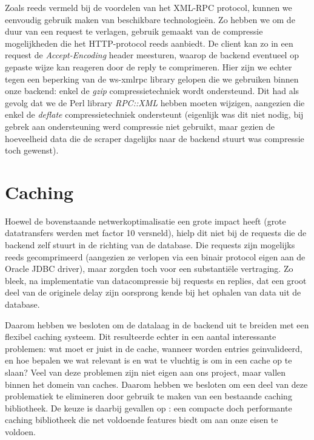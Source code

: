 Zoals reeds vermeld bij de voordelen van het XML-RPC protocol, kunnen we eenvoudig gebruik maken van beschikbare technologie\"en. Zo hebben we om de duur van een request te verlagen, gebruik gemaakt van de compressie mogelijkheden die het HTTP-protocol reeds aanbiedt. De client kan zo in een request de \emph{Accept-Encoding} header meesturen, waarop de backend eventueel op gepaste wijze kan reageren door de reply te comprimeren. Hier zijn we echter tegen een beperking van de ws-xmlrpc library gelopen die we gebruiken binnen onze backend: enkel de \emph{gzip} compressietechniek wordt ondersteund. Dit had als gevolg dat we de Perl library \emph{RPC::XML} hebben moeten wijzigen, aangezien die enkel de \emph{deflate} compressietechniek ondersteunt (eigenlijk was dit niet nodig, bij gebrek aan ondersteuning werd compressie niet gebruikt, maar gezien de hoeveelheid data die de scraper dagelijks naar de backend stuurt was compressie toch gewenst).


\section{Caching}

Hoewel de bovenstaande netwerkoptimalisatie een grote impact heeft (grote datatransfers werden met factor 10 versneld), hielp dit niet bij de requests die de backend zelf stuurt in de richting van de database. Die requests zijn mogelijks reeds gecomprimeerd (aangezien ze verlopen via een binair protocol eigen aan de Oracle JDBC driver), maar zorgden toch voor een substanti\"ele vertraging. Zo bleek, na implementatie van datacompressie bij requests en replies, dat een groot deel van de originele delay zijn oorsprong kende bij het ophalen van data uit de database.

Daarom hebben we besloten om de datalaag in de backend uit te breiden met een flexibel caching systeem. Dit resulteerde echter in een aantal interessante problemen: wat moet er juist in de cache, wanneer worden entries geinvalideerd, en hoe bepalen we wat relevant is en wat te vluchtig is om in een cache op te slaan? Veel van deze problemen zijn niet eigen aan ons project, maar vallen binnen het domein van caches. Daarom hebben we besloten om een deel van deze problematiek te elimineren door gebruik te maken van een bestaande caching bibliotheek. De keuze is daarbij gevallen op : een compacte doch performante caching bibliotheek die net voldoende features biedt om aan onze eisen te voldoen.

